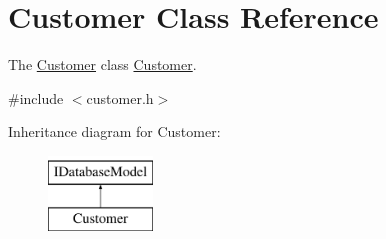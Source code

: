 \hypertarget{classCustomer}{\section{Customer Class Reference}
\label{classCustomer}
}


The \hyperlink{classCustomer}{Customer} class \hyperlink{classCustomer}{Customer}.  




{\ttfamily \#include $<$customer.\+h$>$}

Inheritance diagram for Customer\+:\begin{figure}[H]
\begin{center}
\leavevmode
\includegraphics[height=2.000000cm]{d9/d12/classCustomer}
\end{center}
\end{figure}
